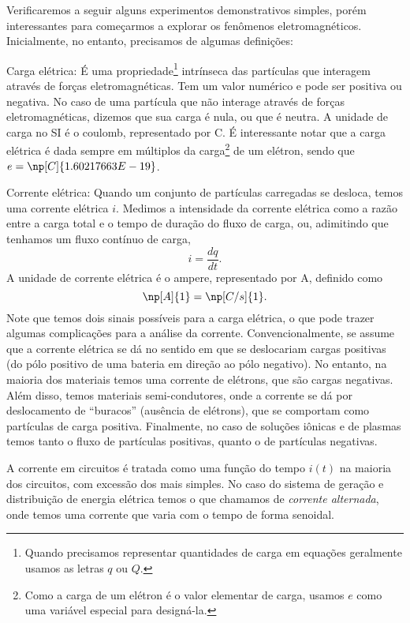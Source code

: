 Verificaremos a seguir alguns experimentos demonstrativos simples, porém interessantes para começarmos a explorar os fenômenos eletromagnéticos. Inicialmente, no entanto, precisamos de algumas definições:
\begin{description}
    \item{Carga elétrica:} É uma propriedade\footnote{Quando precisamos representar quantidades de carga em equações geralmente usamos as letras $q$ ou $Q$.} intrínseca das partículas que interagem através de forças eletromagnéticas. Tem um valor numérico e pode ser positiva ou negativa. No caso de uma partícula que não interage através de forças eletromagnéticas, dizemos que sua carga é nula, ou que é neutra. A unidade de carga no SI é o coulomb, representado por C. É interessante notar que a carga elétrica é dada sempre em múltiplos da carga\footnote{Como a carga de um elétron é o valor elementar de carga, usamos $e$ como uma variável especial para designá-la.} de um elétron, sendo que $e = \np[C]{1.60217663E-19}$.
    
    \item{Corrente elétrica:} Quando um conjunto de partículas carregadas se desloca, temos uma corrente elétrica $i$. Medimos a intensidade da corrente elétrica como a razão entre a carga total e o tempo de duração do fluxo de carga, ou, adimitindo que tenhamos um fluxo contínuo de carga,
    \begin{equation}
        i = \frac{dq}{dt}.
    \end{equation}
    A unidade de corrente elétrica é o ampere, representado por A, definido como
    \begin{equation}
        \np[A]{1} = \np[C/s]{1}.
    \end{equation}
    Note que temos dois sinais possíveis para a carga elétrica, o que pode trazer algumas complicações para a análise da corrente. Convencionalmente, se assume que a corrente elétrica se dá no sentido em que se deslocariam cargas positivas (do pólo positivo de uma bateria em direção ao pólo negativo). No entanto, na maioria dos materiais temos uma corrente de elétrons, que são cargas negativas. Além disso, temos materiais semi-condutores, onde a corrente se dá por deslocamento de ``buracos'' (ausência de elétrons), que se comportam como partículas de carga positiva. Finalmente, no caso de soluções iônicas e de plasmas temos tanto o fluxo de partículas positivas, quanto o de partículas negativas.
    
    A corrente em circuitos é tratada como uma função do tempo $i(t)$ na maioria dos circuitos, com excessão dos mais simples. No caso do sistema de geração e distribuição de energia elétrica temos o que chamamos de \emph{corrente alternada}, onde temos uma corrente que varia com o tempo de forma senoidal.
    

\end{description}
